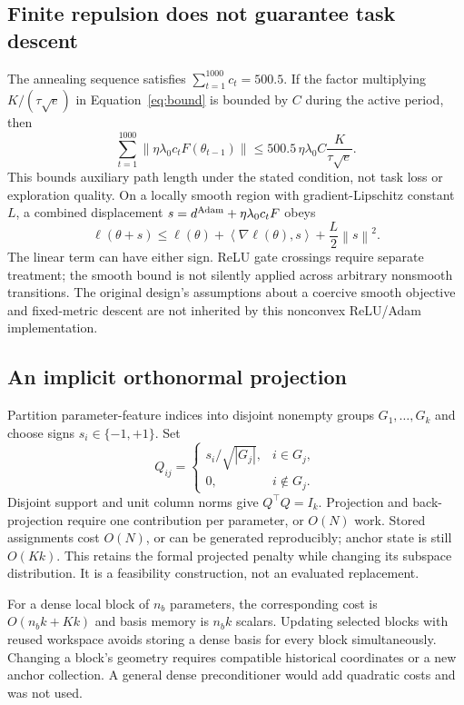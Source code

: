 \documentclass[11pt,letterpaper]{article}
\theoremstyle{remark}\newtheorem{remark}{Remark}
\newcommand{\norm}[1]{\left\lVert#1\right\rVert}
\newcommand{\inner}[2]{\left\langle#1,#2\right\rangle}
\begin{document}
\subsection{Finite repulsion does not guarantee task descent}
The annealing sequence satisfies $\sum_{t=1}^{1000}c_t=500.5$. If the factor multiplying $K/(\tau\sqrt e)$ in Equation~\eqref{eq:bound} is bounded by $C$ during the active period, then
\begin{equation}
\sum_{t=1}^{1000}\norm{\eta\lambda_0c_tF(\theta_{t-1})}
\le 500.5\,\eta\lambda_0 C\frac{K}{\tau\sqrt e}.
\end{equation}
This bounds auxiliary path length under the stated condition, not task loss or exploration quality. On a locally smooth region with gradient-Lipschitz constant $L$, a combined displacement $s=d^{\rm Adam}+\eta\lambda_0c_tF$ obeys
\begin{equation}
\ell(\theta+s)\le\ell(\theta)+\inner{\nabla\ell(\theta)}s+\frac L2\norm s^2.
\end{equation}
The linear term can have either sign. ReLU gate crossings require separate treatment; the smooth bound is not silently applied across arbitrary nonsmooth transitions. The original design's assumptions about a coercive smooth objective and fixed-metric descent are not inherited by this nonconvex ReLU/Adam implementation.

\subsection{An implicit orthonormal projection}
Partition parameter-feature indices into disjoint nonempty groups $G_1,\ldots,G_k$ and choose signs $s_i\in\{-1,+1\}$. Set
\begin{equation}
Q_{ij}=\begin{cases}s_i/\sqrt{|G_j|},&i\in G_j,\\0,&i\notin G_j.\end{cases}
\end{equation}
Disjoint support and unit column norms give $Q^\top Q=I_k$. Projection and back-projection require one contribution per parameter, or $O(N)$ work. Stored assignments cost $O(N)$, or can be generated reproducibly; anchor state is still $O(Kk)$. This retains the formal projected penalty while changing its subspace distribution. It is a feasibility construction, not an evaluated replacement.

For a dense local block of $n_b$ parameters, the corresponding cost is $O(n_bk+Kk)$ and basis memory is $n_bk$ scalars. Updating selected blocks with reused workspace avoids storing a dense basis for every block simultaneously. Changing a block's geometry requires compatible historical coordinates or a new anchor collection. A general dense preconditioner would add quadratic costs and was not used.
\end{document}
